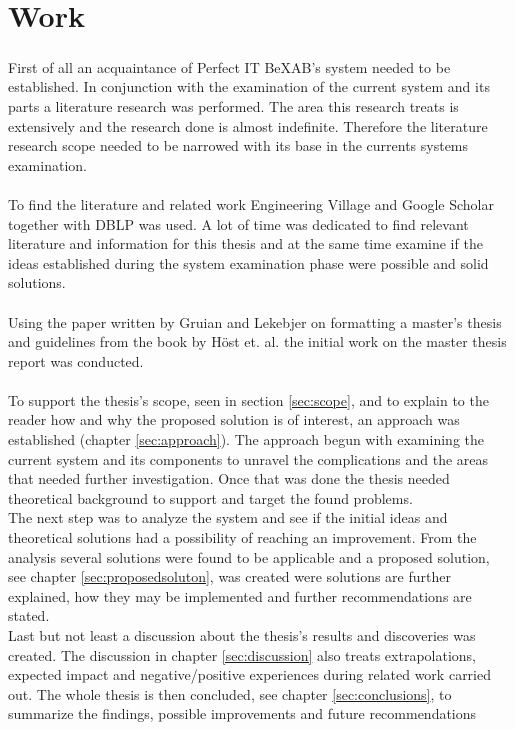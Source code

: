 \documentclass{cslthse-msc}
\newcommand{\bex}{BeX\textsuperscript{\textregistered}}
\begin{document}
\section{Work}
First of all an acquaintance of Perfect IT \bex AB's system needed to be established. In conjunction with the examination of the current system and its parts a literature research was performed. The area this research treats is extensively and the research done is almost indefinite. Therefore the literature research scope needed to be narrowed with its base in the currents systems examination.\\\\    
To find the literature and related work Engineering Village   \cite{Enginvillage} and Google Scholar   \cite{Googlescholar} together with DBLP   \cite{DBLP} was used. A lot of time was dedicated to find relevant literature and information for this thesis and at the same time examine if the ideas established during the system examination phase were possible and solid solutions.\\\\
Using the paper written by Gruian and Lekebjer on formatting a master’s thesis   \cite{Reportmall} and guidelines from the book by Höst et. al.    \cite{regnell} the initial work on the master thesis report was conducted.\\\\ 
To support the thesis's scope, seen in section \ref{sec:scope}, and to explain to the reader how and why the proposed solution is of interest, an approach was established (chapter \ref{sec:approach}). The approach begun with examining the current system and its components to unravel the complications and the areas that needed further investigation. Once that was done the thesis needed theoretical background to support and target the found problems.\\
The next step was to analyze the system and see if the initial ideas and theoretical solutions had a possibility of reaching an improvement.
From the analysis several solutions were found to be applicable and a proposed solution, see chapter \ref{sec:proposedsoluton}, was created were solutions are further explained, how they may be implemented and further recommendations are stated.\\
Last but not least a discussion about the thesis's results and discoveries was created. The discussion in chapter \ref{sec:discussion} also treats extrapolations, expected impact and negative/positive experiences during related work carried out.
The whole thesis is then concluded, see chapter \ref{sec:conclusions}, to summarize the findings, possible improvements and future recommendations\\\\
\end{document}
